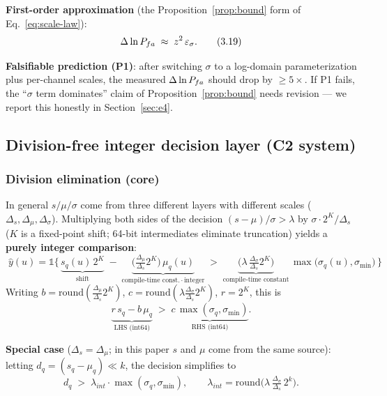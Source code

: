 \textbf{First-order approximation} (the Proposition~\ref{prop:bound} form of Eq.~\eqref{eq:scale-law}):
\begin{equation}
\Delta\ln P_{fa}\;\approx\;z^{2}\,\varepsilon_\sigma .
\tag{3.19}
\label{eq:bound-first-order}
\end{equation}

\textbf{Falsifiable prediction (P1)}: after switching $\sigma$ to a log-domain parameterization plus per-channel scales, the measured $\Delta\ln P_{fa}$ should drop by $\ge 5\times$.
If P1 fails, the ``$\sigma$ term dominates'' claim of Proposition~\ref{prop:bound} needs revision --- we report this honestly in Section~\ref{sec:e4}.

\subsection{Division-free integer decision layer (C2 system)}
\label{sec:decision-layer}

\subsubsection{Division elimination (core)}
\label{sec:divfree}

In general $s/\mu/\sigma$ come from three different layers with different scales ($\Delta_s,\Delta_\mu,\Delta_\sigma$).
Multiplying both sides of the decision $(s-\mu)/\sigma>\lambda$ by $\sigma\cdot 2^{K}/\Delta_s$ ($K$ is a fixed-point shift; 64-bit intermediates eliminate truncation) yields a \textbf{purely integer comparison}:
\begin{equation}
\boxed{\;
\hat{y}(u)=\mathbb{1}\Big\{\,
\underbrace{s_q(u)\,2^{K}}_{\text{shift}}\;-\;
\underbrace{\Big(\tfrac{\Delta_\mu}{\Delta_s}2^{K}\Big)\,\mu_q(u)}_{\text{compile-time const.}\,\cdot\,\text{integer}}
\;>\;
\underbrace{\Big(\lambda\,\tfrac{\Delta_\sigma}{\Delta_s}2^{K}\Big)}_{\text{compile-time constant}}\,
\max\!\big(\sigma_q(u),\sigma_{\min}\big)\,\Big\}}
\tag{3.20}
\label{eq:int-decision-full}
\end{equation}
Writing $b=\mathrm{round}(\frac{\Delta_\mu}{\Delta_s}2^{K})$, $c=\mathrm{round}(\lambda\frac{\Delta_\sigma}{\Delta_s}2^{K})$, $r=2^{K}$, this is
\begin{equation}
\underbrace{r\,s_q - b\,\mu_q}_{\text{LHS (int64)}} \;>\;
\underbrace{c\,\max(\sigma_q,\sigma_{\min})}_{\text{RHS (int64)}}.
\tag{3.21}
\label{eq:int-decision}
\end{equation}

\textbf{Special case} ($\Delta_s=\Delta_\mu$; in this paper $s$ and $\mu$ come from the same source): letting $d_q=(s_q-\mu_q)\ll k$, the decision simplifies to
\begin{equation}
d_q \;>\; \lambda_{int}\cdot\max(\sigma_q,\sigma_{\min}),
\qquad
\lambda_{int}=\mathrm{round}\!\Big(\lambda\,\tfrac{\Delta_\sigma}{\Delta_s}\,2^{k}\Big).
\tag{3.22}
\label{eq:int-decision-simple}
\end{equation}

